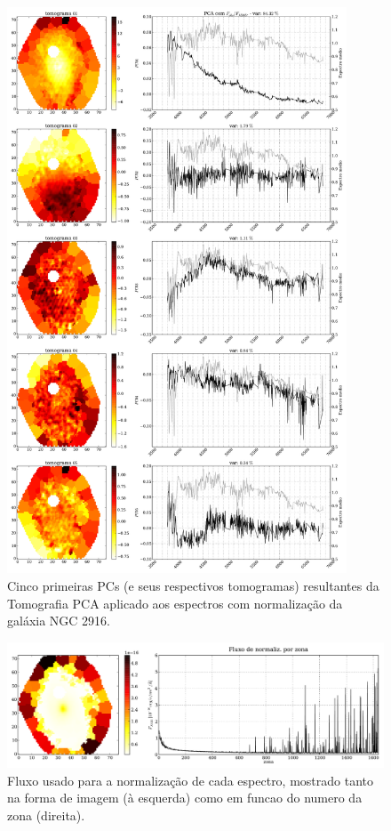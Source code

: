 \begin{figure}
    \includegraphics[width=0.9\textwidth]{figuras/K0277-tomo-obs-norm.pdf}
    \caption[Tomogramas de 1 a 5 da gal\'axia NGC 2916 - $F_{obs} / F_{\lambda 5365}$.]
    {Cinco primeiras PCs (e seus respectivos tomogramas) resultantes da Tomografia PCA aplicado aos espectros com
    normalização da galáxia NGC 2916.}
    \label{fig:K0277tomofobsnorm}
\end{figure}

\begin{figure}
    \includegraphics[width=1.\textwidth]{figuras/K0277-fobs_norm.pdf}
    \caption[Fluxos de normalização para cada zona da galáxia K0277.]
    {Fluxo usado para a normalização de cada espectro, mostrado tanto na forma de imagem (à esquerda) como em funcao do numero da zona (direita).}
    \label{fig:K0277fobsnorm}
\end{figure}

